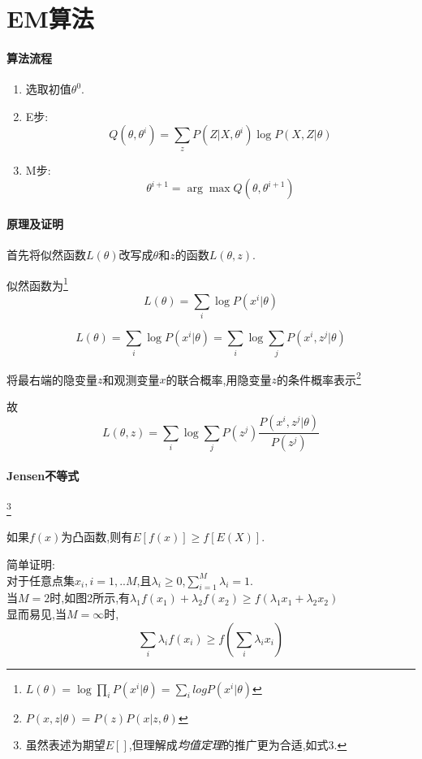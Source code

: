 \documentclass{ctexrep}
\begin{document}
\section{EM算法}

\paragraph{算法流程}
\begin{enumerate}
	\item 选取初值$\theta^{0}$.
	\item E步:$$Q(\theta,\theta^{i})=\sum_z P(Z|X,\theta^{i})\log{P(X,Z|\theta)}$$
	\item M步:$$\theta^{i+1}=\arg\max Q(\theta,\theta^{i+1})$$
\end{enumerate}

\paragraph{原理及证明}
首先将似然函数\cite{概率论-茆}$L(\theta)$改写成$\theta$和$z$的函数$L(\theta,z)$.

似然函数为\footnote{$ L(\theta) = \log\prod\limits_iP(x^i|\theta)= \sum\limits_{i} logP(x^i|\theta) $}
$$L(\theta)=\sum_i \log P(x^i|\theta) $$

\begin{equation}
	L(\theta)=\sum\limits_i\log{P(x^i|\theta)}
	=\sum\limits_i\log{ \sum\limits_j{P(x^i,z^j|\theta)}}
\end{equation}

将最右端的隐变量$z$和观测变量$x$的联合概率,用隐变量$z$的条件概率表示\footnote{$P(x,z|\theta)=P(z)P(x|z,\theta)$}

故
\begin{equation}
	L(\theta,z)=\sum\limits_i{ \log \sum\limits_j{ P(z^j)\frac{P(x^i,z^j|\theta)}{P(z^j)}}}
\end{equation}

\paragraph{Jensen不等式}\footnote{虽然表述为期望$E[]$,但理解成\emph{均值定理}的推广更为合适,如式3.}

如果$f(x)$为凸函数,则有$E[f(x)] \geq f[E(X)]$.

简单证明:\\
对于任意点集${x_i},i=1,..M$,且$\lambda_i\geq0$,$\sum\limits_{i=1}^M{\lambda_i}=1$.\\当$M=2$时,如图2所示,有$\lambda_1f(x_1)+\lambda_2f(x_2)\geq f(\lambda_1x_1+\lambda_2x_2)$\\
显而易见,当$M=\infty$时,
\begin{equation}
	\sum\limits_i{\lambda_if(x_i)}\geq f(\sum\limits_i \lambda_ix_i)
\end{equation}
\end{document}
